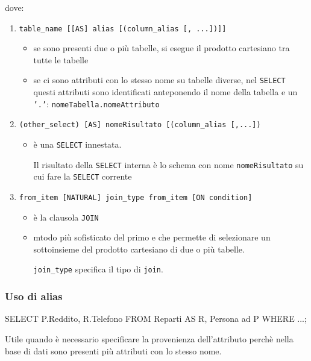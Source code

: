 dove:
\begin{enumerate}[itemsep=\smallskipamount]
  \item  \texttt{table\_name [[AS] alias [(column\_alias [, ...])]]}
  \begin{itemize}[label=$\diamond$, itemsep=\smallskipamount]
    \item se sono presenti due o più tabelle, si esegue il prodotto cartesiano tra tutte le  tabelle
    \item se ci sono attributi con lo stesso nome su tabelle diverse, nel \texttt{SELECT} questi attributi sono identificati anteponendo il nome della tabella e un \texttt{’.’}:  \texttt{nomeTabella.nomeAttributo}
  \end{itemize}

  \item  \texttt{(other\_select) [AS] nomeRisultato [(column\_alias [,...])}
  \begin{itemize}[label=$\diamond$, itemsep=\smallskipamount]
    \item  è una \texttt{SELECT} innestata. 
    
    Il risultato della \texttt{SELECT} interna è lo schema con nome \texttt{nomeRisultato} su cui fare la \texttt{SELECT} corrente
  \end{itemize}

  \item  \texttt{from\_item [NATURAL] join\_type from\_item [ON condition]}
  \begin{itemize}[label=$\diamond$, itemsep=\smallskipamount]
    \item  è la clausola \texttt{JOIN}
    \item mtodo più sofisticato del primo e che permette di selezionare un sottoinsieme del  prodotto cartesiano di due o più tabelle. 
    
    \texttt{join\_type} specifica il tipo di \texttt{join}.
  \end{itemize}
\end{enumerate}

\subsubsection{Uso di alias}

\begin{codiceSQL}
SELECT P.Reddito, R.Telefono
FROM Reparti AS R, Persona ad P
  WHERE ...;
\end{codiceSQL}

Utile quando è necessario specificare la provenienza dell’attributo perchè nella base di dati sono presenti più attributi con lo stesso nome.

